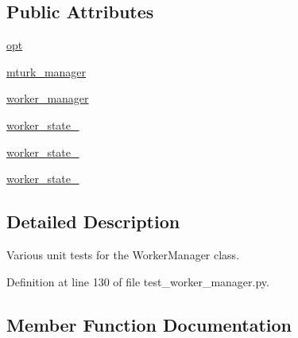 \subsection*{Public Attributes}
\begin{DoxyCompactItemize}
\item 
\hyperlink{classparlai_1_1mturk_1_1core_1_1test_1_1test__worker__manager_1_1TestWorkerManager_af67f20c9e87fe623e231635062f85c36}{opt}
\item 
\hyperlink{classparlai_1_1mturk_1_1core_1_1test_1_1test__worker__manager_1_1TestWorkerManager_a65748a68b183be6b95737c2ece6f9eb7}{mturk\+\_\+manager}
\item 
\hyperlink{classparlai_1_1mturk_1_1core_1_1test_1_1test__worker__manager_1_1TestWorkerManager_a7a1cc523d2e37376dec55345f4cc1ee8}{worker\+\_\+manager}
\item 
\hyperlink{classparlai_1_1mturk_1_1core_1_1test_1_1test__worker__manager_1_1TestWorkerManager_a0b0fa6e1ac589490d7f7634aaf92614e}{worker\+\_\+state\+\_}
\item 
\hyperlink{classparlai_1_1mturk_1_1core_1_1test_1_1test__worker__manager_1_1TestWorkerManager_a8bee0766e2eff8ba5a0e366e7035f2c0}{worker\+\_\+state\+\_}
\item 
\hyperlink{classparlai_1_1mturk_1_1core_1_1test_1_1test__worker__manager_1_1TestWorkerManager_a734d5de0d34ddd0e829bb32fe336dde2}{worker\+\_\+state\+\_}
\end{DoxyCompactItemize}


\subsection{Detailed Description}
\begin{DoxyVerb}Various unit tests for the WorkerManager class.
\end{DoxyVerb}
 

Definition at line 130 of file test\+\_\+worker\+\_\+manager.\+py.



\subsection{Member Function Documentation}
\mbox{\label{classparlai_1_1mturk_1_1core_1_1test_1_1test__worker__manager_1_1TestWorkerManager_aaf2e1ce6d00c18578eee6eed396362f6}} 
